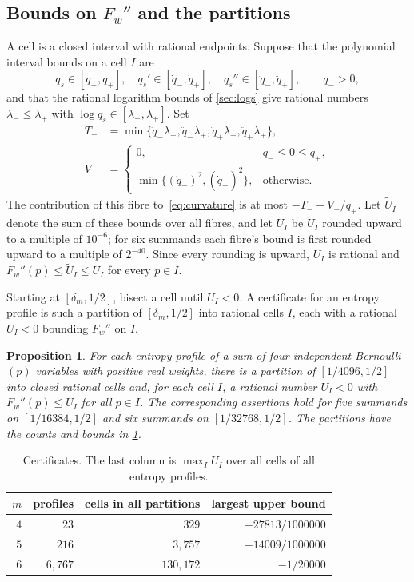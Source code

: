 \documentclass[11pt,a4paper]{article}
\numberwithin{equation}{section}
\newtheorem{proposition}[theorem]{Proposition}
\theoremstyle{remark}
\begin{document}
\subsection{Bounds on \texorpdfstring{$F_w''$}{the second derivative} and the partitions}\label{sec:partitions}

A cell is a closed interval with rational endpoints. Suppose that the polynomial interval bounds on a cell $I$ are
\[
 q_s\in[q_-,q_+],\quad q_s'\in[\dot q_-,\dot q_+],\quad
 q_s''\in[\ddot q_-,\ddot q_+],\qquad q_->0,
\]
and that the rational logarithm bounds of \cref{sec:logs} give rational numbers $\lambda_-\le\lambda_+$ with $\log q_s\in[\lambda_-,\lambda_+]$.
Set
\begin{align*}
 T_-&=\min\{\ddot q_-\lambda_-,\ddot q_-\lambda_+,\ddot q_+\lambda_-,\ddot q_+\lambda_+\},\\
 V_-&=\begin{cases}0,&\dot q_-\le0\le \dot q_+,\\
 \min\{(\dot q_-)^2,(\dot q_+)^2\},&\text{otherwise}.
 \end{cases}
\end{align*}
The contribution of this fibre to~\eqref{eq:curvature} is at most $-T_--V_-/q_+$. Let $\widetilde U_I$ denote the sum of these bounds over all fibres, and let $U_I$ be $\widetilde U_I$ rounded upward to a multiple of $10^{-6}$; for six summands each fibre's bound is first rounded upward to a multiple of $2^{-40}$. Since every rounding is upward, $U_I$ is rational and $F_w''(p)\le\widetilde U_I\le U_I$ for every $p\in I$.

Starting at $[\delta_m,1/2]$, bisect a cell until $U_I<0$. A certificate for an entropy profile is such a partition of $[\delta_m,1/2]$ into rational cells $I$, each with a rational $U_I<0$ bounding $F_w''$ on $I$.

\begin{proposition}\label{prop:certificates}
For each entropy profile of a sum of four independent Bernoulli$(p)$ variables with positive real weights, there is a partition of $[1/4096,1/2]$ into closed rational cells and, for each cell $I$, a rational number $U_I<0$ with $F_w''(p)\le U_I$ for all $p\in I$. The corresponding assertions hold for five summands on $[1/16384,1/2]$ and six summands on $[1/32768,1/2]$. The partitions have the counts and bounds in \cref{tab:certificates}.
\end{proposition}

\begin{table}[ht]
\centering
\begin{tabular}{rrrr}
\toprule
$m$ & profiles & cells in all partitions & largest upper bound\\
\midrule
$4$ & $23$ & $329$ & $-27813/1000000$\\
$5$ & $216$ & $3{,}757$ & $-14009/1000000$\\
$6$ & $6{,}767$ & $130{,}172$ & $-1/20000$\\
\bottomrule
\end{tabular}
\caption{Certificates. The last column is $\max_I U_I$ over all cells of all entropy profiles.}\label{tab:certificates}
\end{table}
\end{document}
